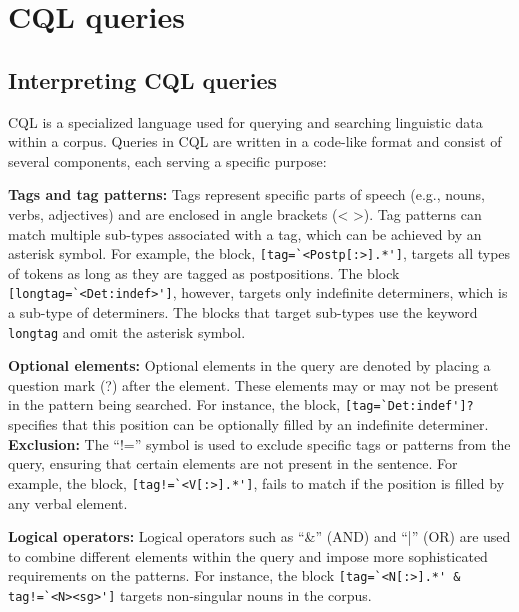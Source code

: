 \section{CQL queries} \label{app:cqlqueries}

\subsection{Interpreting CQL queries}

CQL is a specialized language used for querying and searching linguistic data within a corpus. Queries in CQL are written in a code-like format and consist of several components, each serving a specific purpose:\\
\begin{sloppypar}
\noindent \textbf{Tags and tag patterns:} Tags represent specific parts of speech (e.g., nouns, verbs, adjectives) and are enclosed in angle brackets (< >). Tag patterns can match multiple sub-types associated with a tag, which can be achieved by an asterisk symbol. For example, the block, \Verb"[tag=`<Postp[:>].*']", targets all types of tokens as long as they are tagged as postpositions. The block \mbox{\Verb"[longtag=`<Det:indef>']"}, however, targets only indefinite determiners, which is a sub-type of determiners. The blocks that target sub-types use the keyword \Verb"longtag" and omit the asterisk symbol.\\
\end{sloppypar}
\noindent \textbf{Optional elements:} Optional elements in the query are denoted by placing a question mark (?) after the element. These elements may or may not be present in the pattern being searched. For instance, the block, \Verb"[tag=`Det:indef']?" specifies that this position can be optionally filled by an indefinite determiner.\\

\noindent \textbf{Exclusion:} The ``!='' symbol is used to exclude specific tags or patterns from the query, ensuring that certain elements are not present in the sentence. For example, the block, \Verb"[tag!=`<V[:>].*']", fails to match if the position is filled by any verbal element.\\

\begin{sloppypar}
	\noindent \textbf{Logical operators:} Logical operators such as ``\&'' (AND) and ``|'' (OR) are used to combine different elements within the query and impose more sophisticated requirements on the patterns. For instance, the block \Verb"[tag=`<N[:>].*' & tag!=`<N><sg>']" targets non-singular nouns in the corpus.
\end{sloppypar}

